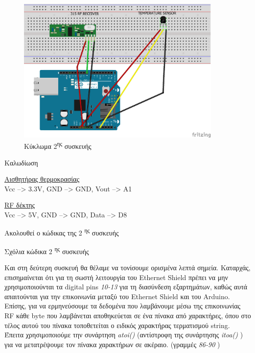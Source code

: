 \documentclass[twoside,a4paper]{article}
\newcommand\tab[1][1cm]{\hspace*{#1}}
\begin{document}
 \newpage 
\vspace{5mm}
 \begin{figure}[h]
 \includegraphics[width=0.9\textwidth,center]{dev2}
 \caption{ Κύκλωμα 2\textsuperscript{ης} συσκευής}
 \end{figure}
\vspace{4mm}
 {\large\center Καλωδίωση\\}
  \vspace{6mm}
 \par\textendash\hspace{0.5mm} \underline{Αισθητήρας θερμοκρασίας} \\
 
 \tab\hspace{1.5mm} Vcc --> 3.3V, GND --> GND, Vout --> A1 \\
 
 \par\textendash\hspace{0.5mm} \underline{RF δέκτης} \\
  
 \tab\hspace{1.5mm} Vcc --> 5V, GND --> GND, Data --> D8\\
 \newpage
 {\large \begin{center} Ακολουθεί ο κώδικας της 2 \textsuperscript{ης} συσκευής \end{center}}
 
 \newpage
 {\large \begin{center} Σχόλια κώδικα 2 \textsuperscript{ης} συσκευής\end{center}}
 \begin{flushleft}
 \par Και στη δεύτερη συσκευή θα θέλαμε να τονίσουμε ορισμένα λεπτά σημεία. 
Καταρχάς, επισημαίνεται ότι για τη σωστή λειτουργία του Ethernet Shield πρέπει να μην χρησιμοποιούνται τα digital pins \textit{10-13} για τη διασύνδεση εξαρτημάτων, καθώς αυτά απαιτούνται για την επικοινωνία μεταξύ του Ethernet Shield και του Arduino.
Επίσης, για να ερμηνεύσουμε τα δεδομένα που λαμβάνουμε μέσω της επικοινωνίας RF κάθε byte που λαμβάνεται αποθηκεύεται σε ένα πίνακα από χαρακτήρες, όπου στο τέλος αυτού του πίνακα τοποθετείται ο ειδικός χαρακτήρας τερματισμού string. Έπειτα χρησιμοποιούμε την συνάρτηση \textit{atoi()} (αντίστροφη της συνάρτησης \textit{itoa()} ) για να μετατρέψουμε τον πίνακα χαρακτήρων σε ακέραιο. (γραμμές \textit{86-90} )
 \end{flushleft}
\end{document}
